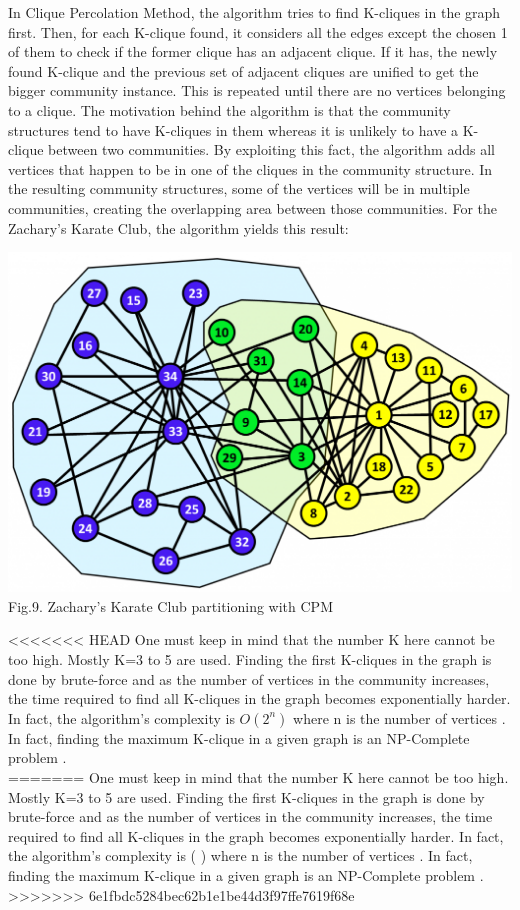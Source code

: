 \documentclass[10pt]{article}
\begin{document}
In Clique Percolation Method, the algorithm tries to find K-cliques in the graph first. Then, for each K-clique found, it considers all the edges except the chosen 1 of them to check if the former clique has an adjacent clique. If it has, the newly found K-clique and the previous set of adjacent cliques are unified to get the bigger community instance. This is repeated until there are no vertices belonging to a clique\cite{eleven}.
The motivation behind the algorithm is that the community structures tend to have K-cliques in them whereas it is unlikely to have a K-clique between two communities. By exploiting this fact, the algorithm adds all vertices that happen to be in one of the cliques in the community structure. In the resulting community structures, some of the vertices will be in multiple communities, creating the overlapping area between those communities. For the Zachary’s Karate Club, the algorithm yields this result: \\

\begin{center}%
    \includegraphics[scale=0.2]{karateclique.png} \\
    Fig.9. Zachary’s Karate Club partitioning with CPM 
\end{center}

<<<<<<< HEAD
One must keep in mind that the number K here cannot be too high. Mostly K=3 to 5 are used. Finding the first K-cliques in the graph is done by brute-force and as the number of vertices in the community increases, the time required to find all K-cliques in the graph becomes exponentially harder. In fact, the algorithm’s complexity is $O \left( 2^{n}\right)$ where n is the number of vertices \cite{eleven}. In fact, finding the maximum K-clique in a given graph is an NP-Complete problem \cite{clique}. \\
=======
One must keep in mind that the number K here cannot be too high. Mostly K=3 to 5 are used. Finding the first K-cliques in the graph is done by brute-force and as the number of vertices in the community increases, the time required to find all K-cliques in the graph becomes exponentially harder. In fact, the algorithm’s complexity is ( ) where n is the number of vertices \cite{eleven}. In fact, finding the maximum K-clique in a given graph is an NP-Complete problem \cite{clique}. \\
>>>>>>> 6e1fbdc5284bec62b1e1be44d3f97ffe7619f68e
\end{document}
